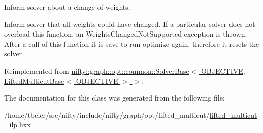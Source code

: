 Inform solver about a change of weights. 

Inform solver that all weights could have changed. If a particular solver does not overload this function, an Weights\+Changed\+Not\+Supported exception is thrown. After a call of this function it is save to run optimize again, therefore it resets the solver 

Reimplemented from \hyperlink{classnifty_1_1graph_1_1opt_1_1common_1_1SolverBase_a6a5d77ee514c4b5f44d1908c1000f0ff}{nifty\+::graph\+::opt\+::common\+::\+Solver\+Base$<$ O\+B\+J\+E\+C\+T\+I\+V\+E, Lifted\+Multicut\+Base$<$ O\+B\+J\+E\+C\+T\+I\+V\+E $>$ $>$}.



The documentation for this class was generated from the following file\+:\begin{DoxyCompactItemize}
\item 
/home/tbeier/src/nifty/include/nifty/graph/opt/lifted\+\_\+multicut/\hyperlink{lifted__multicut__ilp_8hxx}{lifted\+\_\+multicut\+\_\+ilp.\+hxx}\end{DoxyCompactItemize}
